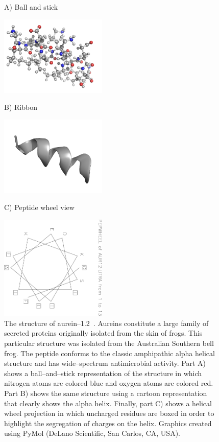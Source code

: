         \begin{figure}[ptb]
        A) Ball and stick
        \begin{center}
        \includegraphics[width=2.0in]{Body/Images-chap2/1vm5-balls.png}
        \end{center}

        \smallskip
        B) Ribbon
        \begin{center}
        \includegraphics[width=2.0in]{Body/Images-chap2/1vm5-ribbon.png}
        \end{center}

        \smallskip
        C) Peptide wheel view
        \begin{center}
        \includegraphics[angle=90,width=2.0in]{Body/Images-chap2/pepwheel.pdf}
        \end{center}
        \caption[The structure of aurein]{The structure of aurein--1.2~\cite{wang2005correlation}.
            Aureins constitute a large family of secreted proteins
            originally isolated from the skin of frogs.
            This particular structure was isolated from the
            Australian Southern bell frog.  The peptide conforms to
            the classic amphipathic alpha helical structure and has wide--spectrum antimicrobial activity.
            Part A) shows a ball--and--stick representation of the
            structure in which nitrogen atoms are colored blue and
            oxygen atoms are colored red.  Part B) shows the same
            structure using a cartoon representation that clearly
            shows the alpha helix.  Finally, part C) shows a helical
            wheel projection in which uncharged residues are boxed
            in order to highlight the segregation of charges on the
            helix.  Graphics created using PyMol (DeLano Scientific,
        San Carlos, CA, USA).
        }
        \label{fig:aurein}
        \end{figure}

